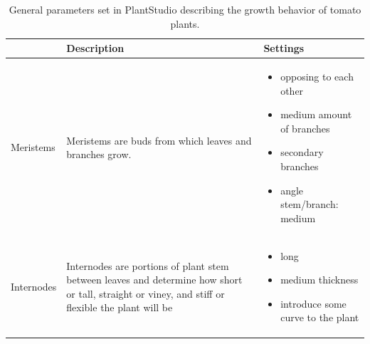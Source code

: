 \begin{longtable}[c]{@{}p{}p{}p{}@{}}
	\caption{General parameters set in PlantStudio describing the growth behavior of tomato plants.}
	\label{tab:parameters_plantStudio}\\
	\toprule
	& Description                                                                                                                                                                                                                 & Settings                                                                                                                                                                      \\* \midrule
	\endhead
	\bottomrule
	\endfoot
	\endlastfoot
	Meristems               & Meristems are buds from which leaves and branches grow.                                                                                                                                                                     & \vspace{-25pt}
	 \begin{itemize}
		\item opposing to each other \vspace{-10pt}
		\item medium amount of branches \vspace{-10pt}
		\item secondary branches \vspace{-10pt}
		\item angle stem/branch: medium \vspace{-10pt}   
	\end{itemize} \\
	Internodes              & Internodes are portions of plant stem between leaves and determine how short or tall, straight or viney, and stiff or flexible the plant will be                                                                            & \vspace{-25pt}
	\begin{itemize}
		\item long \vspace{-10pt}
		\item medium thickness \vspace{-10pt}
		\item introduce some curve to the plant \vspace{-10pt}
	\end{itemize} \\

\end{longtable}
